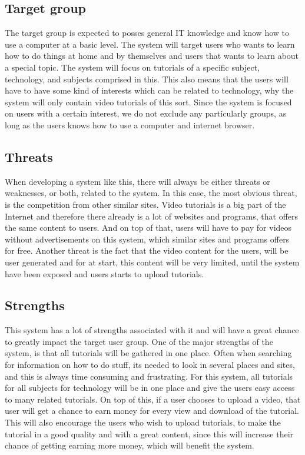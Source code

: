 \subsection{Target group}
The target group is expected to posses general IT knowledge and know how to use a computer at a basic level. The system will target users who wants to learn how to do things at home and by themselves and users that wants to learn about a special topic. The system will focus on tutorials of a specific subject, technology, and subjects comprised in this. This also means that the users will have to have some kind of interests which can be related to technology, why the system will only contain video tutorials of this sort. Since the system is focused on users with a certain interest, we do not exclude any particularly groups, as long as the users knows how to use a computer and internet browser.  

\subsection{Threats}
When developing a system like this, there will always be either threats or weaknesses, or both, related to the system. In this case, the most obvious threat, is the competition from other similar sites. Video tutorials is a big part of the Internet and therefore there already is a lot of websites and programs, that offers the same content to users. And on top of that, users will have to pay for videos without advertisements on this system, which similar sites and programs offers for free. Another threat is the fact that the video content for the users, will be user generated and for at start, this content will be very limited, until the system have been exposed and users starts to upload tutorials.

\subsection{Strengths} \label{Strengths}
This system has a lot of strengths associated with it and will have a great chance to greatly impact the target user group. One of the major strengths of the system, is that all tutorials will be gathered in one place. Often when searching for information on how to do stuff, its needed to look in several places and sites, and this is always time consuming and frustrating. For this system, all tutorials for all subjects for technology will be in one place and give the users easy access to many related tutorials. On top of this, if a user chooses to upload a video, that user will get a chance to earn money for every view and download of the tutorial. This will also encourage the users who wish to upload tutorials, to make the tutorial in a good quality and with a great content, since this will increase their chance of getting earning more money, which will benefit the system.\\

